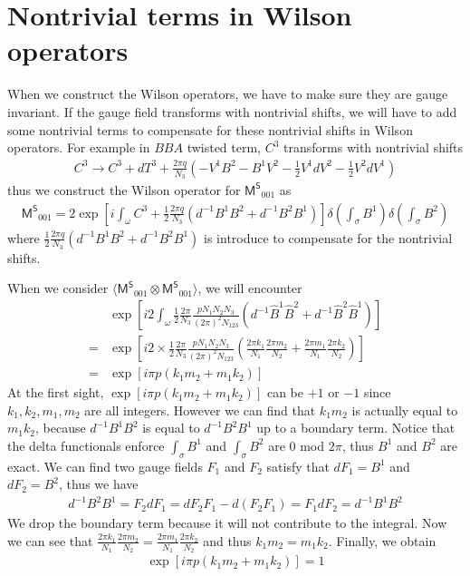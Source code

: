 \documentclass[11pt,nofootinbib,preprint]{revtex4-1}
\begin{document}
\section{Nontrivial terms in Wilson operators\label{ap1}}
When we construct the Wilson operators, we have to make sure they are gauge invariant. If the gauge field transforms with nontrivial shifts, we will have to add some nontrivial terms to compensate for these nontrivial shifts in Wilson operators. For example in $BBA$ twisted term, $C^3$ transforms with nontrivial shifts
\begin{align}
	C^3\rightarrow C^3+dT^3+\frac{2\pi q}{N_3}\left( -V^1B^2-B^1V^2-\frac{1}{2}V^1dV^2-\frac{1}{2}V^2dV^1 \right) 
\end{align}
thus we construct the Wilson operator for $\mathsf{M^S}_{001}$ as 
\begin{align}
	\mathsf{M^S}_{001}=2\exp \left[ i\int_{\omega}{C^3+\frac{1}{2}\frac{2\pi q}{N_3}\left( d^{-1}B^1B^2+d^{-1}B^2B^1 \right)} \right] \delta \left( \int_{\sigma}{B^1} \right) \delta \left( \int_{\sigma}{B^2} \right) 
\end{align}
where $\frac{1}{2}\frac{2\pi q}{N_3}\left( d^{-1}B^1B^2+d^{-1}B^2B^1 \right)$ is introduce to compensate for the nontrivial shifts.

When we consider $\langle \mathsf{M^S}_{001}\otimes \mathsf{M^S}_{001} \rangle $, we will encounter 
\begin{align}
	&\exp \left[ i2\int_{\omega}{\frac{1}{2}\frac{2\pi}{N_3}\frac{pN_1N_2N_3}{\left( 2\pi \right) ^2N_{123}}\left( d^{-1}\hat{B}^1\hat{B}^2+d^{-1}\hat{B}^2\hat{B}^1 \right)} \right] \nonumber
	\\
	=&\exp \left[ i2\times\frac{1}{2}\frac{2\pi}{N_3}\frac{pN_1N_2N_3}{\left( 2\pi \right) ^2N_{123}}\left( \frac{2\pi k_1}{N_1}\frac{2\pi m_2}{N_2}+\frac{2\pi m_1}{N_1}\frac{2\pi k_2}{N_2} \right) \right] \nonumber
	\\
	=&\exp \left[ i\pi p\left( k_1m_2+m_1k_2 \right) \right] 
\end{align}
At the first sight, $\exp \left[ i\pi p\left( k_1m_2+m_1k_2 \right) \right]$ can be $+1$ or $-1$ since $k_1,k_2,m_1,m_2$ are all integers. However we can find that $k_1m_2$ is actually equal to $m_1k_2$, because $d^{-1}B^1B^2$ is equal to $d^{-1}B^2B^1$ up to a boundary term. Notice that the delta functionals enforce $\int_{\sigma}{B^1}$ and $\int_{\sigma}{B^2}$ are $0$ mod $2\pi$, thus $B^1$ and $B^2$ are exact. We can find two gauge fields $F_1$ and $F_2$ satisfy that $dF_1=B^1$ and $dF_2=B^2$, thus we have
\begin{align}
	d^{-1}B^2B^1=F_2dF_1=dF_2F_1-d\left( F_2F_1 \right) =F_1dF_2=d^{-1}B^1B^2
\end{align}
We drop the boundary term because it will not contribute to the integral. Now we can see that $\frac{2\pi k_1}{N_1}\frac{2\pi m_2}{N_2}=\frac{2\pi m_1}{N_1}\frac{2\pi k_2}{N_2}$ and thus $k_1m_2=m_1k_2$. Finally, we obtain 
\begin{align}
	\exp \left[ i\pi p\left( k_1m_2+m_1k_2 \right) \right] =1
\end{align}
\end{document}
